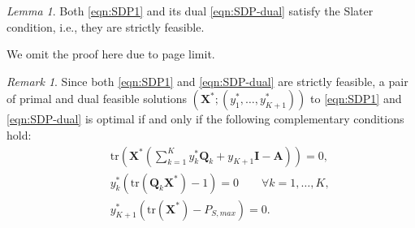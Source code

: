 \documentclass[twocolumn,10pt]{IEEEtran}
\theoremstyle{plain} \newtheorem{theorem}{Theorem}
\theoremstyle{plain} \newtheorem{proposition}{Proposition}
\theoremstyle{plain} \newtheorem{corollary}{Corollary}
\theoremstyle{remark} \newtheorem{remark}{Remark}
\theoremstyle{remark} \newtheorem{lemma}{Lemma}
\theoremstyle{plain} \newtheorem{definition}{Definition}
\theoremstyle{plain} \newtheorem{assumption}{Assumption}
\theoremstyle{plain} \newtheorem{fact}{Fact}
\begin{document}
\begin{lemma}\label{lem:2}
Both \eqref{eqn:SDP1} and its dual \eqref{eqn:SDP-dual} satisfy the Slater condition, i.e., they are strictly feasible.
\end{lemma}
We omit the proof here due to page limit.
\begin{remark}
Since both \eqref{eqn:SDP1} and \eqref{eqn:SDP-dual} are strictly feasible, a pair of primal and dual feasible solutions $(\mathbf{X}^*;(y_1^*, \ldots,y_{K+1}^*))$ to \eqref{eqn:SDP1} and \eqref{eqn:SDP-dual} is optimal if and only if the following complementary conditions hold:
\begin{subequations}\label{eqn:comp}
\begin{eqnarray}
&&\mathrm{tr}\left(\mathbf{X}^*\left(\sum_{k=1}^{K} y_k^*\mathbf{Q}_k+y_{K+1}\mathbf{I}-\mathbf{A}\right)\right)=0,\label{eqn:comp1}\\
&&y_k^*\left(\mathrm{tr}(\mathbf{Q}_k\mathbf{X^*})-1\right)=0 \qquad\forall k=1,\ldots,K, \label{eqn:comp2} \\
&&y_{K+1}^*\left(\mathrm{tr}(\mathbf{X^*})-P_{S,max}\right)=0.
\end{eqnarray}
\end{subequations}
\end{remark}
\end{document}
